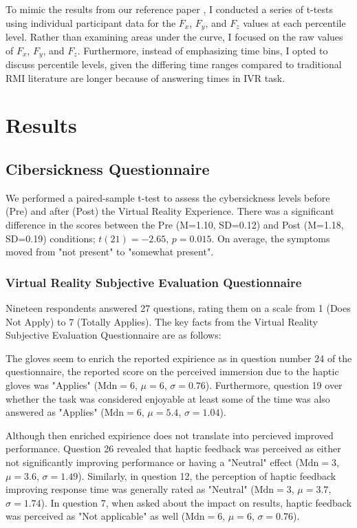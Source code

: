 \documentclass[12pt,oneside,openright]{report}
\begin{document}
To mimic the results from our reference paper \Cite{SALTAFOSSI2023108642}, I conducted a series of t-tests using individual participant data for the $F_x$, $F_y$, and $F_z$ values at each percentile level. Rather than examining areas under the curve, I focused on the raw values of $F_x$, $F_y$, and $F_z$. Furthermore, instead of emphasizing time bins, I opted to discuss percentile levels, given the differing time ranges compared to traditional RMI literature are longer because of answering times in IVR task.

\section*{Results}
\subsection*{Cibersickness Questionnaire}
 
We performed a paired-sample t-test to assess the cybersickness levels before (Pre) and after (Post) the Virtual Reality Experience. There was a significant difference in the scores between the Pre (M=1.10, SD=0.12) and Post (M=1.18, SD=0.19) conditions; $t(21)=-2.65$, $p = 0.015$. On average, the symptoms moved from "not present" to "somewhat present". 

\subsubsection*{Virtual Reality Subjective Evaluation Questionnaire}
Nineteen respondents answered 27 questions, rating them on a scale from 1 (Does Not Apply) to 7 (Totally Applies). The key facts from the Virtual Reality Subjective Evaluation Questionnaire are as follows:
    
The gloves seem to enrich the reported expirience as in question number 24 of the questionnaire, the reported score on the perceived immersion due to the haptic gloves was "Applies" ($\text{Mdn} = 6$, $\mu = 6$, $\sigma = 0.76$). Furthermore, question 19 over whether the task was considered enjoyable at least some of the time was also answered as "Applies" ($\text{Mdn} = 6$, $\mu = 5.4$, $\sigma = 1.04$).
        
Although then enriched expirience does not translate into percieved improved performance. Question 26 revealed that haptic feedback was perceived as either not significantly improving performance or having a "Neutral" effect ($\text{Mdn} = 3$, $\mu = 3.6$, $\sigma = 1.49$). Similarly, in question 12, the perception of haptic feedback improving response time was generally rated as "Neutral" ($\text{Mdn} = 3$, $\mu = 3.7$, $\sigma = 1.74$). In question 7, when asked about the impact on results, haptic feedback was perceived as "Not applicable" as well ($\text{Mdn} = 6$, $\mu = 6$, $\sigma = 0.76$).
    
\end{document}
